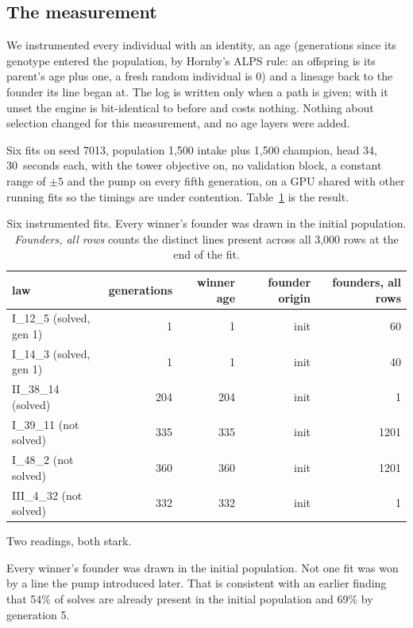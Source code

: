 \documentclass[11pt,a4paper]{article}
\begin{document}
\subsection{The measurement}
\label{sec:measurement}

We instrumented every individual with an identity, an age (generations since its
genotype entered the population, by Hornby's ALPS rule: an offspring is its
parent's age plus one, a fresh random individual is 0) and a lineage back to the
founder its line began at. The log is written only when a path is given; with it
unset the engine is bit-identical to before and costs nothing. Nothing about
selection changed for this measurement, and no age layers were added.

Six fits on seed 7013, population 1{,}500 intake plus 1{,}500 champion, head 34,
30~seconds each, with the tower objective on, no validation block, a constant
range of $\pm5$ and the pump on every fifth generation, on a GPU shared with
other running fits so the timings are under contention.
Table~\ref{tab:lineage} is the result.

\begin{table}[htbp]
\centering
\begin{tabular}{lrrrr}
\toprule
law & generations & winner age & founder origin & founders, all rows \\
\midrule
I\_12\_5 (solved, gen 1)   & 1   & 1   & init & 60 \\
I\_14\_3 (solved, gen 1)   & 1   & 1   & init & 40 \\
II\_38\_14 (solved)        & 204 & 204 & init & 1 \\
I\_39\_11 (not solved)     & 335 & 335 & init & 1201 \\
I\_48\_2 (not solved)      & 360 & 360 & init & 1201 \\
III\_4\_32 (not solved)    & 332 & 332 & init & 1 \\
\bottomrule
\end{tabular}
\caption{Six instrumented fits. Every winner's founder was drawn in the initial
population. \emph{Founders, all rows} counts the distinct lines present across all 3{,}000
rows at the end of the fit.}
\label{tab:lineage}
\end{table}

Two readings, both stark.

Every winner's founder was drawn in the initial population. Not one fit was won
by a line the pump introduced later. That is consistent with an earlier finding
that 54\% of solves are already present in the initial population and 69\% by
generation 5.
\end{document}
